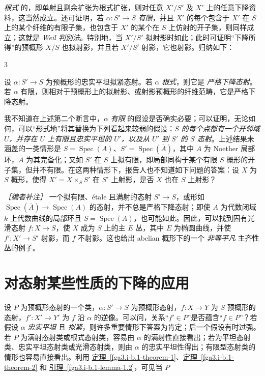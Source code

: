 \begin{enumerate}
\emph{根式} 的，即单射且剩余扩张为根式扩张，则对任意 \(X'/S'\) 及 \(X'\) 上的任意下降资料，这当然成立。还可证明，若 \(\alpha \colon  S'\to  S\) \emph{有限}，并且 \(X'\) 的每个包含于 \(X'\) 在 \(S\) 上的某个纤维的有限子集，也包含于 \(X'\) 的某个在 \(S\) 上仿射的开子集，则同样成立；这就是 \emph{Weil 判别法}。特别地，当 \(X'/S'\) 拟射影时如此；此时可证明“下降所得”的预概形 \(X/S\) 也拟射影，并且若 \(X'/S'\) 射影，它也射影。归纳如下：\begin{theorem}{3}\label{fga3.i-b.1-theorem-3}\skipsinglepar\par{}设 \(\alpha \colon  S'\to  S\) 为预概形的忠实平坦拟紧态射。若 \(\alpha \) \emph{根式}，则它是 \emph{严格下降态射}。若 \(\alpha \) 有限，则相对于预概形上的拟射影、或射影预概形的纤维范畴，它是严格下降态射。\end{theorem}\begin{remark}{}\label{fga3.i-b.1-remark}\skipsinglepar\par{}我不知道在上述第二个断言中，\(\alpha \) \emph{有限} 的假设是否确实必要；可以证明，无论如何，可以“形式地”将其替换为下列看起来较弱的假设：\emph{\(S\) 的每个点都有一个开邻域 \(U\)，并存在 \(U\) 上有限且忠实平坦的 \(U'\)，以及从 \(U'\) 到 \(S'\) 的 \(S\) 态射}。上述结果未涵盖的一类情形是 \(S=\operatorname {Spec}(A)\)、\(S'=\operatorname {Spec}(\overline {A})\)，其中 \(A\) 为 Noether 局部环，\(\overline {A}\) 为其完备化；又如 \(S'\) 在 \(S\) 上拟有限，即局部同构于某个有限 \(S\) 概形的开子集，但并不有限。在这两种情形下，报告人也不知道如下问题的答案：设 \(X\) 为 \(S\) 概形，使得 \(X'=X\times _S S'\) 在 \(S'\) 上射影，是否 \(X\) 也在 \(S\) 上射影？\par{}\emph{［编者补注］} 一个拟有限、étale 且满射的态射 \(S'\to  S\)，或形如 \(\operatorname {Spec}(\overline {A})\to \operatorname {Spec}(A)\) 的态射，并不总是严格下降态射；即使 \(A\) 为代数闭域 \(k\) 上代数曲线的局部环且 \(S=\operatorname {Spec}(A)\)，也可能如此。因此，可以找到固有光滑态射 \(f\colon  X\to  S\)，使 \(X\) 成为 \(S\) 上的主 \(E\) 丛，其中 \(E\) 为椭圆曲线，并使 \(f'\colon  X'\to  S'\) 射影，而 \(f\) 不射影。这也给出 abelian 概形下的一个 \emph{非等平凡} 主齐性丛的例子。\end{remark}\section{对态射某些性质的下降的应用}\label{fga3.i-b.2}\par{}设 \(P\) 为预概形态射的一个类，\(\alpha \colon  S'\to  S\) 为预概形态射，\(f\colon  X\to  Y\) 为 \(S\) 预概形的态射，\(f'\colon  X'\to  Y'\) 为 \(f\) 沿 \(\alpha \) 的逆像。可以问，关系“\(f'\in  P\)”是否蕴含“\(f\in  P\)”？若假设 \(\alpha \) \emph{忠实平坦} 且 \emph{拟紧}，则许多重要情形下答案为肯定；后一个假设有时过强。若 \(P\) 为满射态射类或根式态射类，容易由 \(\alpha \) 的满射性直接看出；若为平坦态射类、忠实平坦态射类或光滑态射类，则由 \(\alpha \) 的忠实平坦性得出；有限型态射类的情形也容易直接看出。利用 \hyperref[fga3.i-b.1-theorem-1]{定理~\ref*{fga3.i-b.1-theorem-1}}、\hyperref[fga3.i-b.1-theorem-2]{定理~\ref*{fga3.i-b.1-theorem-2}} 和 \hyperref[fga3.i-b.1-lemma-1.2]{引理~\ref*{fga3.i-b.1-lemma-1.2}}，可见当 \(P\) 
\end{enumerate}
